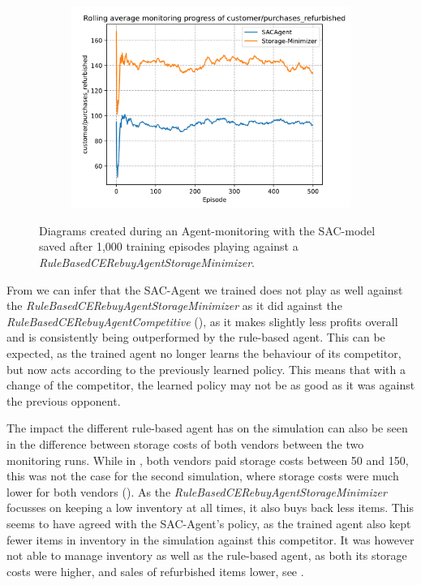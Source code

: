 \begin{figure}[t]
	\begin{subfigure}{0.49\textwidth}
		\centering
		\includegraphics[width = \textwidth]{images/experiments/SACDuopolyOtherComp/SACOtherCompPurchasesRefurbished.pdf}\\
		\label{fig:SACDuopolyOtherCompetitors3}
	\end{subfigure}
	\caption{Diagrams created during an Agent-monitoring with the SAC-model saved after 1,000 training episodes playing against a \emph{RuleBasedCERebuyAgentStorageMinimizer}.}\label{fig:SACDuopolyOtherCompetitors}
\end{figure}

From  we can infer that the SAC-Agent we trained does not play as well against the \emph{RuleBasedCERebuyAgentStorageMinimizer} as it did against the \emph{RuleBasedCERebuyAgentCompetitive} (), as it makes slightly less profits overall and is consistently being outperformed by the rule-based agent. This can be expected, as the trained agent no longer learns the behaviour of its competitor, but now acts according to the previously learned policy. This means that with a change of the competitor, the learned policy may not be as good as it was against the previous opponent.

The impact the different rule-based agent has on the simulation can also be seen in the difference between storage costs of both vendors between the two monitoring runs. While in , both vendors paid storage costs between 50 and 150, this was not the case for the second simulation, where storage costs were much lower for both vendors (). As the \emph{RuleBasedCERebuyAgentStorageMinimizer} focusses on keeping a low inventory at all times, it also buys back less items. This seems to have agreed with the SAC-Agent's policy, as the trained agent also kept fewer items in inventory in the simulation against this competitor. It was however not able to manage inventory as well as the rule-based agent, as both its storage costs were higher, and sales of refurbished items lower, see .

